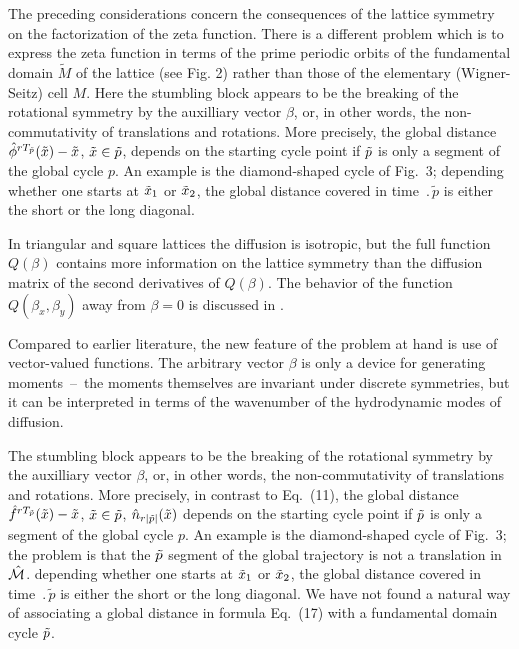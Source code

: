 The preceding considerations concern the consequences of the lattice symmetry
on the factorization of the zeta function.  There is a different problem which
is to express the zeta function in terms of the prime periodic orbits of the
fundamental domain $\tilde M$ of the lattice (see Fig. 2) rather than
those of the elementary (Wigner-Seitz) cell $M$.
Here the stumbling block appears to be
the breaking of the rotational symmetry by
the auxilliary vector $\beta$, or, in other words,
the non-commutativity of translations and rotations.
More precisely, the global distance
$ \hat\phi^{r {T_{\tilde{p}}}} (\tilde x{}) - \tilde x{} $, $\tilde x{} \in {\tilde p}$,
depends on the starting cycle point if
${\tilde p}$ is only a segment of the global cycle $p$. An
example is the diamond-shaped cycle of Fig.~3;
depending whether one starts at $\tilde x_1$ or $\tilde x_2$, the global
distance covered in time $\period{\tilde{p}}$ is either the short or the
long diagonal.

In triangular and square lattices the diffusion is isotropic, but the
full function $Q(\beta)$ contains more information on the lattice
symmetry than the diffusion matrix of the second derivatives of
$Q(\beta)$. The behavior of the function $Q(\beta_x, \beta_y)$ away from
$\beta=0$ is discussed in . 

Compared to earlier literature, the new feature of the
problem at hand is use of vector-valued functions. The arbitrary vector
$\beta$ is only a device for generating moments~--~the moments themselves
are invariant under discrete symmetries, but it can be interpreted in
terms of the wavenumber of the hydrodynamic modes of diffusion.

The stumbling block
appears to be
 the breaking of the rotational symmetry by
 the auxilliary vector $\beta$, or, in other words,
the non-commutativity of translations and rotations.
More precisely,
in contrast to Eq.~(11), the global distance
$ \hat f^{r {T_{\tilde{p}}}} (\tilde x{}) - \tilde x{} $, $\tilde x{} \in {\tilde p}$,
 $ \hat{n}_{r |\tilde p|}(\tilde x{}) $
depends on the starting cycle point if
${\tilde p}$ is only a segment of the global cycle $p$. An
example is the diamond-shaped cycle of Fig.~3;
the problem is that the ${\tilde p}$ segment of
the global trajectory is not a translation in $\hat {{\cal M}}$.
depending whether one starts at $\tilde x_1$ or $\tilde x_2$, the global
distance covered in time $\period{\tilde{p}}$ is either the short or the
long diagonal. We have not found a natural way of associating
a global distance in  formula Eq.~(17) with a fundamental domain
cycle ${\tilde p}$.

